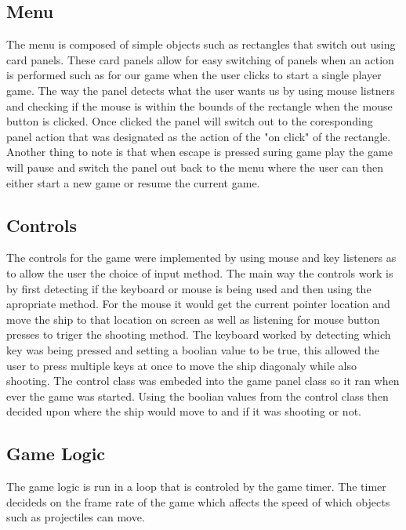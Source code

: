 \subsection{Menu}
The menu is composed of simple objects such as rectangles that switch out using card panels. These card panels allow for easy switching of panels when an action is performed such as for our game when the user clicks to start a single player game. The way the panel detects what the user wants us by using mouse listners and checking if the mouse is within the bounds of the rectangle when the mouse button is clicked. Once clicked the panel will switch out to the coresponding panel action that was designated as the action of the "on click" of the rectangle. Another thing to note is that when escape is pressed suring game play the game will pause and switch the panel out back to the menu where the user can then either start a new game or resume the current game.
\subsection{Controls}
The controls for the game were implemented by using mouse and key listeners as to allow the user the choice of input method. The main way the controls work is by first detecting if the keyboard or mouse is being used and then using the apropriate method. For the mouse it would get the current pointer location and move the ship to that location on screen as well as listening for mouse button presses to triger the shooting method. The keyboard worked by detecting which key was being pressed and setting a boolian value to be true, this allowed the user to press multiple keys at once to move the ship diagonaly while also shooting. The control class was embeded into the game panel class so it ran when ever the game was started. Using the boolian values from the control class then decided upon where the ship would move to and if it was shooting or not.
\subsection{Game Logic}
The game logic is run in a loop that is controled by the game timer. The timer decideds on the frame rate of the game which affects the speed of which objects such as projectiles can move.
